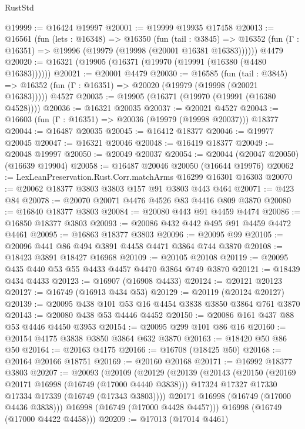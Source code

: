 \begin{lexlean}{RustStd}
\begin{coremodule}
@19999 := @16424 @19997
@20001 := @19999 @19935 @17458
@20013 := @16561
    (fun (lets : @16348) =>
    @16350
      (fun (tail : @3845) =>
      @16352 (fun (Γ : @16351) => @19996 (@19979 (@19998 (@20001 @16381 @16383))))))
    @4479
@20020 := @16321 (@19905 (@16371 (@19970 (@19991 (@16380 (@4480 @16383))))))
@20021 := @20001 @4479
@20030 := @16585
    (fun (tail : @3845) => @16352 (fun (Γ : @16351) => @20020 (@19979 (@19998 (@20021 @16383)))))
    @4527
@20035 := @19905 (@16371 (@19970 (@19991 (@16380 @4528))))
@20036 := @16321 @20035
@20037 := @20021 @4527
@20043 := @16603 (fun (Γ : @16351) => @20036 (@19979 (@19998 @20037))) @18377
@20044 := @16487 @20035
@20045 := @16412 @18377
@20046 := @19977 @20045
@20047 := @16321 @20046
@20048 := @16419 @18377
@20049 := @20048 @19997
@20050 := @20049 @20037
@20054 := @20044 (@20047 @20050) (@16639 @19904)
@20058 := @16487 @20046 @20050 (@16644 @19976)
@20062 := LexLeanPreservation.Rust.Corr.matchArms @16299 @16301 @16303
@20070 := @20062 @18377 @3803 @3803 @157 @91 @3803 @443 @464
@20071 := @423 @84
@20078 := @20070 @20071 @4476 @4526 @83 @4416 @809 @3870
@20080 := @16840 @18377 @3803
@20084 := @20080 @443 @91 @4459 @4474
@20086 := @16850 @18377 @3803
@20093 := @20086 @432 @442 @495 @91 @4459 @4472 @4461
@20095 := @16863 @18377 @3803
@20096 := @20095 @99
@20105 := @20096 @441 @86 @494 @3891 @4458 @4471 @3864 @744 @3870
@20108 := @18423 @3891 @18427 @16968
@20109 := @20105 @20108
@20119 := @20095 @435 @440 @53 @55 @4433 @4457 @4470 @3864 @749 @3870
@20121 := @18439 @434 @4433
@20123 := @16907 (@16908 @4433)
@20124 := @20121 @20123
@20127 := @16749 (@16913 @434 @53)
@20129 := @20119 (@20124 @20127)
@20139 := @20095 @438 @101 @53 @16 @4454 @3838 @3850 @3864 @761 @3870
@20143 := @20080 @438 @53 @4446 @4452
@20150 := @20086 @161 @437 @88 @53 @4446 @4450 @3953
@20154 := @20095 @299 @101 @86 @16
@20160 := @20154 @4175 @3838 @3850 @3864 @632 @3870
@20163 := @18420 @50 @86 @50
@20164 := @20163 @4175
@20166 := @16708 (@18425 @50)
@20168 := @20164 @20166 @18751
@20169 := @20160 @20168
@20171 := @16992 @18377 @3803
@20207 := @20093
    (@20109
      (@20129
        (@20139
          (@20143
            (@20150
              (@20169 @20171 @16998 (@16749 (@17000 @4440 @3838)))
              @17324
              @17327
              @17330
              @17334
              @17339
              (@16749 (@17343 @3803))))
          @20171
          @16998
          (@16749 (@17000 @4436 @3838)))
        @16998
        (@16749 (@17000 @4428 @4457)))
      @16998
      (@16749 (@17000 @4422 @4458)))
@20209 := @17013 (@17014 @4461)

\end{coremodule}
\end{lexlean}
